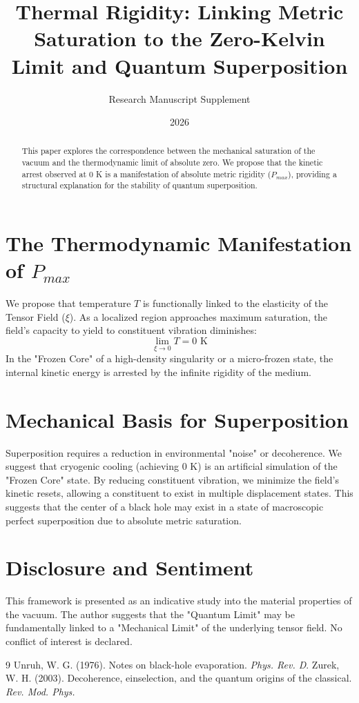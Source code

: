\documentclass[11pt]{article}
\title{\textbf{Thermal Rigidity: Linking Metric Saturation to the Zero-Kelvin Limit and Quantum Superposition}}
\author{Research Manuscript Supplement}
\date{2026}
\begin{document}
\maketitle

\begin{abstract}
This paper explores the correspondence between the mechanical saturation of the vacuum and the thermodynamic limit of absolute zero. We propose that the kinetic arrest observed at 0 K is a manifestation of absolute metric rigidity ($P_{max}$), providing a structural explanation for the stability of quantum superposition.
\end{abstract}

\section{The Thermodynamic Manifestation of $P_{max}$}
We propose that temperature $T$ is functionally linked to the elasticity of the Tensor Field ($\xi$). As a localized region approaches maximum saturation, the field's capacity to yield to constituent vibration diminishes:
\begin{equation}
\lim_{\xi \to 0} T = 0 \text{ K}
\end{equation}
In the "Frozen Core" of a high-density singularity or a micro-frozen state, the internal kinetic energy is arrested by the infinite rigidity of the medium.



\section{Mechanical Basis for Superposition}
Superposition requires a reduction in environmental "noise" or decoherence. We suggest that cryogenic cooling (achieving 0 K) is an artificial simulation of the "Frozen Core" state. By reducing constituent vibration, we minimize the field's kinetic resets, allowing a constituent to exist in multiple displacement states. This suggests that the center of a black hole may exist in a state of macroscopic perfect superposition due to absolute metric saturation.

\section{Disclosure and Sentiment}
This framework is presented as an indicative study into the material properties of the vacuum. The author suggests that the "Quantum Limit" may be fundamentally linked to a "Mechanical Limit" of the underlying tensor field. No conflict of interest is declared.

\begin{thebibliography}{9}
 Unruh, W. G. (1976). Notes on black-hole evaporation. \textit{Phys. Rev. D}.
 Zurek, W. H. (2003). Decoherence, einselection, and the quantum origins of the classical. \textit{Rev. Mod. Phys.}
\end{thebibliography}
\end{document}
